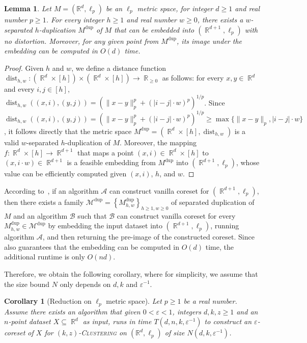 \documentclass[letterpaper,11pt]{article}
\theoremstyle{plain}
\newtheorem{lemma}[theorem]{Lemma}
\newtheorem{corollary}[theorem]{Corollary}
\theoremstyle{definition}
\theoremstyle{remark}
\DeclareMathOperator{\R}{\mathbb{R}}
\DeclareMathOperator{\dist}{dist}
\newcommand{\dup}{\mathrm{dup}}
\newcommand{\eps}{\varepsilon}
\newcommand{\calA}{\mathcal{A}}
\newcommand{\calB}{\mathcal{B}}
\newcommand{\calM}{\mathcal{M}}
\newcommand{\ProblemName}[1]{\textsc{#1}}
\newcommand{\kzC}{\ProblemName{$(k,z)$-Clustering}\xspace}
\begin{document}
\begin{appendices}
\begin{lemma}
    \label{lem:duplication for Euclidean case}
    Let $M=(\mathbb{R}^d,\ell_p)$ be an $\ell_p$ metric space, for integer $d\geq 1$ and real number $p\geq 1$.
For every integer $h\ge 1$ and real number $w\ge 0$, there exists a $w$-separated $h$-duplication $M^\dup$ of $M$ that can be embedded into $(\R^{d+1},\ell_p)$ with no distortion. Moreover, for any given point from $M^\dup$, its image under the embedding can be computed in $O(d)$ time.
\end{lemma}
\begin{proof}
    Given $h$ and $w$, we define a distance function $\dist_{h,w}:(\R^d\times [h])\times (\R^d\times [h])\to \R_{\ge 0}$ as follows: for every $x,y\in \R^d$ and every $i,j\in [h]$, $\dist_{h,w}((x,i),(y,j)) = \left(\|x-y\|_p^p + (|i-j|\cdot w)^p \right)^{1/p}$. 
Since $\dist_{h,w}((x,i),(y,j)) = \left(\|x-y\|_p^p + (|i-j|\cdot w)^p \right)^{1/p}\ge \max\{\|x-y\|_p, |i-j|\cdot w\}$, it follows directly that the metric space $M^\dup = (\R^d\times [h], \dist_{h,w})$ is a valid $w$-separated $h$-duplication of $M$. 
Moreover, the mapping $f:\R^d\times [h]\to \R^{d+1}$ that maps a point $(x,i)\in \R^d\times [h]$ to $(x,i\cdot w)\in \R^{d+1}$ is a feasible embedding from $M^\dup$ into $(\R^{d+1}, \ell_p)$, whose value can be efficiently computed given $(x,i)$, $h$, and $w$.
\end{proof}

According to~, 
if an algorithm $\calA$ can construct vanilla coreset for $(\R^{d+1},\ell_p)$, then there exists a family $\calM^\dup = \left\{M^\dup_{h,w} \right\}_{h\ge 1,w\ge 0}$ of separated duplication of $M$ and an algorithm $\calB$ such that $\calB$ can construct vanilla coreset for every $M^\dup_{h,w}\in\calM^\dup$ by embedding the input dataset into $(\R^{d+1}, \ell_p)$, running algorithm $\calA$, and then returning the pre-image of the constructed coreset.
Since  also guarantees that the embedding can be computed in $O(d)$ time, the additional runtime is only $O(nd)$.

Therefore, we obtain the following corollary, where for simplicity, we assume that the size bound $N$ only depends on $d,k$ and $\eps^{-1}$.


\begin{corollary}[Reduction on $\ell_p$ metric space]
    \label{cor:Euclidean space}
    Let $p\ge 1$ be a real number. 
    Assume there exists an algorithm that given $0<\eps<1$, integers $d, k,z\ge 1$ and an $n$-point dataset $X\subseteq \R^{d}$ as input, runs in time $T(d,n,k,\eps^{-1})$ to construct an $\eps$-coreset of $X$  for \kzC on $(\mathbb{R}^d, \ell_p)$ of size $N(d,k,\eps^{-1})$.


\end{corollary}
\end{appendices}
\end{document}
